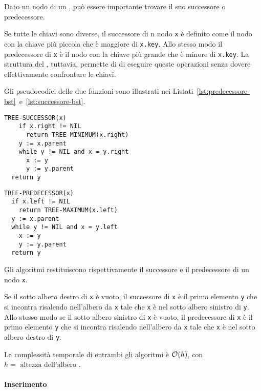 \documentclass[italian, 10pt]{article}
\begin{document}
Dato un nodo di un \BST, può essere importante trovare il suo successore o predecessore.

Se tutte le chiavi sono diverse, il successore di n nodo \texttt{x} è definito come il nodo con la chiave più piccola che è maggiore di \texttt{x.key}.
Allo stesso modo il predecessore di \texttt{x} è il nodo con la chiave più grande che è minore di \texttt{x.key}.
La struttura del \BST, tuttavia, permette di di eseguire queste operazioni senza dovere effettivamente confrontare le chiavi.

Gli pseudocodici delle due funzioni sono illustrati nei Listati~\ref{lst:predecessore-bst}~e~\ref{lst:successore-bst}.

\begin{minipage}[t]{0.495\textwidth}
  \begin{lstlisting}[style=pseudocode, caption={Successore di di un nodo}, label={lst:successore-bst}]
TREE-SUCCESSOR(x)
    if x.right != NIL
      return TREE-MINIMUM(x.right)
    y := x.parent
    while y != NIL and x = y.right
      x := y
      y := y.parent
  return y
  \end{lstlisting}
\end{minipage}
\begin{minipage}[t]{0.495\textwidth}
  \begin{lstlisting}[style=pseudocode, caption={Successore di di un nodo}, label={lst:predecessore-bst}]
TREE-PREDECESSOR(x)
  if x.left != NIL
    return TREE-MAXIMUM(x.left)
  y := x.parent
  while y != NIL and x = y.left
    x := y
    y := y.parent
  return y
      \end{lstlisting}
\end{minipage}

Gli algoritmi restituiscono rispettivamente il successore e il predecessore di un nodo \texttt{x}.

\bigskip
Se il sotto albero destro di \texttt{x} è vuoto, il successore di \texttt{x} è il primo elemento \texttt{y} che si incontra risalendo nell'albero da \texttt{x} tale che \texttt{x} è nel sotto albero sinistro di \texttt{y}.
Allo stesso modo se il sotto albero sinistro di \texttt{x} è vuoto, il predecessore di \texttt{x} è il primo elemento \texttt{y} che si incontra risalendo nell'albero da \texttt{x} tale che \texttt{x} è nel sotto albero destro di \texttt{y}.

\bigskip
La complessità temporale di entrambi gli algoritmi è \(\mathcal{O}(h)\), con \(h = \text{ altezza dell'albero }\).

\paragraph{Inserimento}
\label{par:inserimento-bst}
\end{document}
